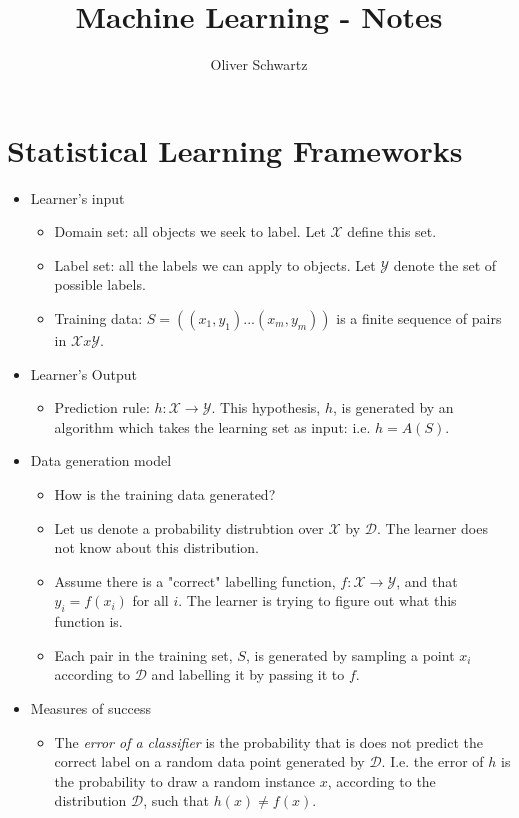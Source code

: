 \documentclass[11pt]{article}
\title{\textbf{Machine Learning - Notes}}
\author{Oliver Schwartz}
\date{}
\begin{document}
\maketitle

\section{Statistical Learning Frameworks}
 
\begin{itemize}
\item Learner's input
\begin{itemize}
\item Domain set: all objects we seek to label. Let $\mathcal{X}$ define this set.
\item Label set: all the labels we can apply to objects. Let $\mathcal{Y}$ denote the set of possible labels.
\item Training data: $S = ((x_{1},y_{1})...(x_{m},y_{m}))$ is a finite sequence of pairs in $\mathcal{X} x \mathcal{Y}$.
\end{itemize}
\item Learner's Output
\begin{itemize}
\item Prediction rule: $h: \mathcal{X} \rightarrow \mathcal{Y}$. This hypothesis, $h$, is generated by an algorithm which takes the learning set as input: i.e. $h = A(S)$.
\end{itemize}

\item Data generation model
\begin{itemize}
\item How is the training data generated?
\item Let us denote a probability distrubtion over $\mathcal{X}$ by $\mathcal{D}$. The learner does not know about this distribution.
\item Assume there is a "correct" labelling function, $f: \mathcal{X} \rightarrow \mathcal{Y}$, and that $y_{i} = f(x_{i})$ for all $i$. The learner is trying to figure out what this function is. 
\item Each pair in the training set, $S$, is generated by sampling a point $x_{i}$ according to $\mathcal{D}$ and labelling it by passing it to $f$.
\end{itemize}

\item Measures of success
\begin{itemize}
\item The \emph{error of a classifier} is the probability that is does not predict the correct label on a random data point generated by $\mathcal{D}$. I.e. the error of $h$ is the probability to draw a random instance $x$, according to the distribution $\mathcal{D}$, such that $h(x) \neq f(x)$.
\end{itemize}


\end{itemize}
\end{document}
